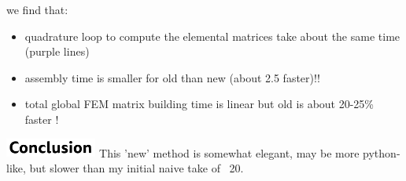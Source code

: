 we find that:
\begin{itemize}
\item quadrature loop to compute the elemental matrices take about the same time (purple lines) 
\item assembly time is smaller for old than new (about 2.5 faster)!!
\item total global FEM matrix building time is linear but old is about 20-25\% faster !
\end{itemize}

\includegraphics[width=3cm]{images/conclusion}
This 'new' method is somewhat elegant, may be more python-like, 
but slower than my initial naive take of \stone~20. 




